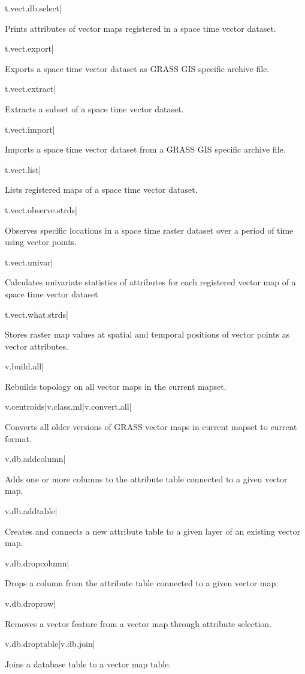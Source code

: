 t.vect.db.select|

Prints attributes of vector maps registered in a space time vector
dataset.

t.vect.export|

Exports a space time vector dataset as GRASS GIS specific archive
file.

t.vect.extract|

Extracts a subset of a space time vector dataset.

t.vect.import|

Imports a space time vector dataset from a GRASS GIS specific archive
file.

t.vect.list|

Lists registered maps of a space time vector dataset.

t.vect.observe.strds|

Observes specific locations in a space time raster dataset over a
period of time using vector points.

t.vect.univar|

Calculates univariate statistics of attributes for each registered
vector map of a space time vector dataset

t.vect.what.strds|

Stores raster map values at spatial and temporal positions of vector
points as vector attributes.

v.build.all|

Rebuilds topology on all vector maps in the current mapset.

v.centroids|v.class.ml|v.convert.all|

Converts all older versions of GRASS vector maps in current mapset
to current format.

v.db.addcolumn|

Adds one or more columns to the attribute table connected to a given
vector map.

v.db.addtable|

Creates and connects a new attribute table to a given layer of an
existing vector map.

v.db.dropcolumn|

Drops a column from the attribute table connected to a given vector
map.

v.db.droprow|

Removes a vector feature from a vector map through attribute selection.

v.db.droptable|v.db.join|

Joins a database table to a vector map table.


